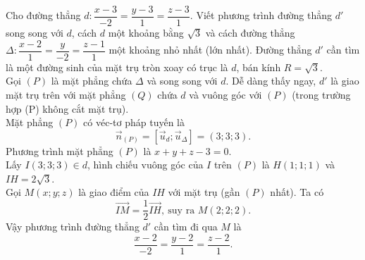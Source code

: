 \begin{vd}%
Cho đường thẳng $d\colon\dfrac{x-3}{-2}=\dfrac{y-3}{1}=\dfrac{z-3}{1}$. Viết phương trình đường thẳng $d'$ song song với $d$, cách $d$ một khoảng bằng $\sqrt{3}$ và cách đường thẳng $\Delta\colon\dfrac{x-2}{1}=\dfrac{y}{-2}=\dfrac{z-1}{1}$ một khoảng nhỏ nhất (lớn nhất).
\loigiai
{
Đường thẳng $d'$ cần tìm là một đường sinh của mặt trụ tròn xoay có trục là $d$, bán kính $R=\sqrt{3}$.\\
Gọi $(P)$ là mặt phẳng chứa $\Delta$ và song song với $d$. Dễ dàng thấy ngay, $d'$ là giao mặt trụ trên với mặt phẳng $(Q)$ chứa $d$ và vuông góc với $(P)$ (trong trường hợp (P) không cắt mặt trụ).\\
Mặt phẳng $(P)$ có véc-tơ pháp tuyến là 
\[\vec{n}_{(P)}=\left[\vec{u}_d;\vec{u}_\Delta\right]=(3;3;3).\]
Phương trình mặt phẳng $(P)$ là $x+y+z-3=0$.\\
Lấy $I(3;3;3)\in d$, hình chiếu vuông góc của $I$ trên $(P)$ là $H(1;1;1)$ và $IH=2\sqrt{3}$.\\
Gọi $M(x;y;z)$ là giao điểm của $IH$ với mặt trụ (gần $(P)$ nhất). Ta có
\[\vec{IM}=\dfrac{1}{2}\vec{IH},~\text{suy ra } M(2;2;2).\]
Vậy phương trình đường thẳng $d'$ cần tìm đi qua $M$ là
\[\dfrac{x-2}{-2}=\dfrac{y-2}{1}=\dfrac{z-2}{1}.\]
}
\end{vd}
